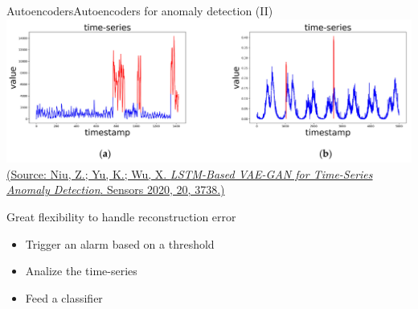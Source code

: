 \documentclass[10pt,compress]{beamer} %
\begin{document}
\begin{frame}{Autoencoders}{Autoencoders for anomaly detection (II)}
	\centering\includegraphics[width=0.75\linewidth]{figs/autoencoderts.png}\\
	\scriptsize\href{https://www.mdpi.com/1424-8220/20/13/3738}{(Source: Niu, Z.; Yu, K.; Wu, X. \textit{LSTM-Based VAE-GAN for Time-Series Anomaly Detection}. Sensors 2020, 20, 3738.)}

	\bigskip
	\begin{flushleft}
	\normalsize{
	Great flexibility to handle reconstruction error
	\begin{itemize}
		\item Trigger an alarm based on a threshold
		\item Analize the time-series
		\item Feed a classifier
	\end{itemize}
	}
	\end{flushleft}
\end{frame}
\end{document}
